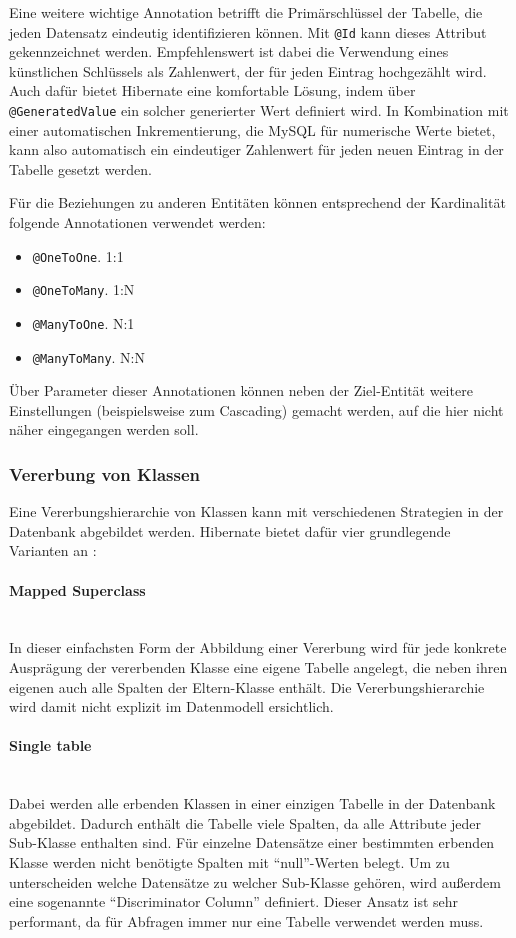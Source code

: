 Eine weitere wichtige Annotation betrifft die Primärschlüssel der Tabelle, die jeden Datensatz eindeutig identifizieren können. Mit \texttt{@Id} kann dieses Attribut gekennzeichnet werden.
Empfehlenswert ist dabei die Verwendung eines künstlichen Schlüssels als Zahlenwert, der für jeden Eintrag hochgezählt wird.
Auch dafür bietet Hibernate eine komfortable Lösung, indem über \texttt{@GeneratedValue} ein solcher generierter Wert definiert wird.
In Kombination mit einer automatischen Inkrementierung, die MySQL für numerische Werte bietet, kann also automatisch ein eindeutiger Zahlenwert für jeden neuen Eintrag in der Tabelle gesetzt werden.

Für die Beziehungen zu anderen Entitäten können entsprechend der Kardinalität folgende Annotationen verwendet werden:
\begin{itemize}
\item{\texttt{@OneToOne}.} 1:1
\item{\texttt{@OneToMany}.} 1:N
\item{\texttt{@ManyToOne}.} N:1
\item{\texttt{@ManyToMany}.} N:N
\end{itemize}

Über Parameter dieser Annotationen können neben der Ziel-Entität weitere Einstellungen (beispielsweise zum Cascading) gemacht werden, auf die hier nicht näher eingegangen werden soll.

\subsubsection{Vererbung von Klassen}
Eine Vererbungshierarchie von Klassen kann mit verschiedenen Strategien in der Datenbank abgebildet werden.
Hibernate bietet dafür vier grundlegende Varianten an \cite{Mihalcea2017}:
\paragraph{Mapped Superclass}$\;$ \\
In dieser einfachsten Form der Abbildung einer Vererbung wird für jede konkrete Ausprägung der vererbenden Klasse eine eigene Tabelle angelegt, die neben ihren eigenen auch alle Spalten der Eltern-Klasse enthält.
Die Vererbungshierarchie wird damit nicht explizit im Datenmodell ersichtlich.
\paragraph{Single table}$\;$ \\
Dabei werden alle erbenden Klassen in einer einzigen Tabelle in der Datenbank abgebildet. Dadurch enthält die Tabelle viele Spalten, da alle Attribute jeder Sub-Klasse enthalten sind.
Für einzelne Datensätze einer bestimmten erbenden Klasse werden nicht benötigte Spalten mit \enquote{null}-Werten belegt.
Um zu unterscheiden welche Datensätze zu welcher Sub-Klasse gehören, wird außerdem eine sogenannte \enquote{Discriminator Column} definiert.
Dieser Ansatz ist sehr performant, da für Abfragen immer nur eine Tabelle verwendet werden muss.
